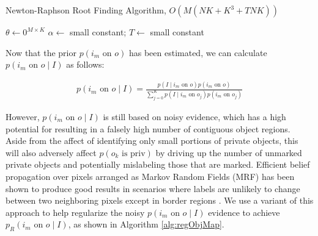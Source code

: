 \documentclass[11pt]{article}
\begin{document}
\begin{algorithm}[h!]\label{alg:newtraph}
\caption{Newton-Raphson Root Finding Algorithm, $O(M(NK + K^3 + TNK))$}
	$\theta \leftarrow 0^{M \times K}$\;
	$\alpha \leftarrow$ small constant; $T \leftarrow$ small constant\;
\end{algorithm}

Now that the prior $p(i_m \textrm{ on } o)$ has been estimated, we can calculate $p(i_m \textrm{ on } o \mid I)$ as follows:

\begin{align}
    p(i_m \textrm{ on } o \mid I) = 
	    \frac{p(I \mid i_m \textrm{ on } o) p(i_m \textrm{ on } o)}{\sum_{j=0}^{K} p(I \mid i_m \textrm{ on } o_j) p(i_m \textrm{ on } o_j)}    
\end{align}

However, $p(i_m \textrm{ on } o \mid I)$ is still based on noisy evidence, which has a high potential for resulting in a falsely high number of contiguous object regions.  Aside from the affect of identifying only small portions of private objects, this will also adversely affect $p(o_k \textrm{ is priv})$ by driving up the number of unmarked private objects and potentially mislabeling those that are marked.  Efficient belief propagation over pixels arranged as Markov Random Fields (MRF) has been shown to produce good results in scenarios where labels are unlikely to change between two neighboring pixels except in border regions \cite{felzenszwalb2006efficient}.  We use a variant of this approach to help regularize the noisy $p(i_m \textrm{ on } o \mid I)$ evidence to achieve $p_R(i_m \textrm{ on } o \mid I)$, as shown in Algorithm \ref{alg:regObjMap}.
\end{document}
